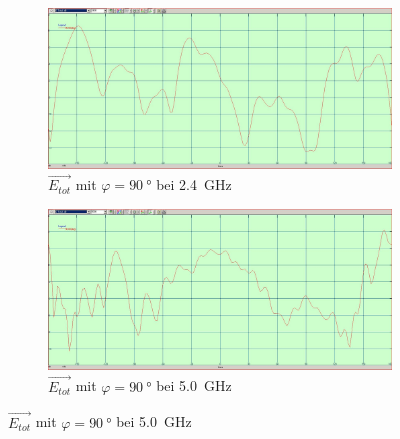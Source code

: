 \begin{figure}[h!]
	\centering
	\begin{subfigure}[b]{0.48\textwidth}
		\includegraphics[width=1\textwidth]{../fig/plt/2G4_90phi_etot_dB.JPG}
		\caption{$\vec{E_{tot}}$ mit $\varphi=\SI{90}{\degree}$ bei \SI{2.4}{\giga\hertz}}
	\end{subfigure}
	\begin{subfigure}[b]{0.48\textwidth}
		\includegraphics[width=1\textwidth]{../fig/plt/5G0_90phi_etot_dB.JPG}
		\caption{$\vec{E_{tot}}$ mit $\varphi=\SI{90}{\degree}$ bei \SI{5.0}{\giga\hertz}}
	\end{subfigure}


\end{figure}
